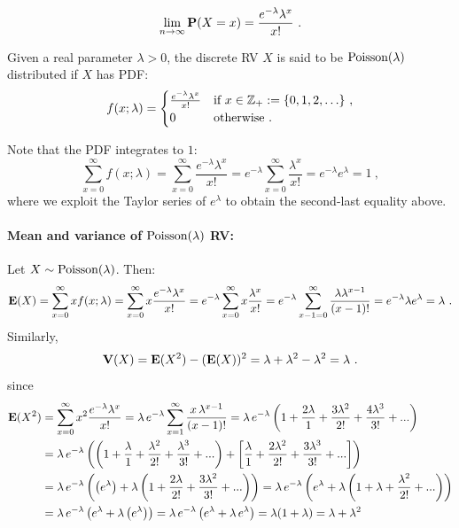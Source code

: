 \[
\lim_{n \to \infty} \mathbf{P}(X=x)
= \frac{ e^{-\lambda} \lambda^x}{x!}  \ .
\]
\begin{model}\label{M:Poisson}
Given a real parameter $\lambda>0$, the discrete RV $X$ is said to be $\mbox{{\rm Poisson}}(\lambda)$ distributed if $X$ has PDF:
\begin{equation}\label{E:Poissonpdf}
f(x;\lambda) =
\begin{cases}
 \frac{ e^{-\lambda} \lambda^x}{x!} & \text{if $x \in \mathbb{Z}_+ := \{0,1,2,\ldots\}$} \ , \\
0 & \text{otherwise} \ .
\end{cases}
\end{equation}

Note that the PDF integrates to $1$:
\[
\sum_{x=0}^{\infty} f(x;\lambda)
= \sum_{x=0}^{\infty}  \frac{ e^{-\lambda} \lambda^x}{x!}
=  e^{-\lambda} \sum_{x=0}^{\infty}  \frac{\lambda^x}{x!}
=  e^{-\lambda} e^{\lambda}
= 1 \ ,
\]
where we exploit the Taylor series of $e^{\lambda}$ to obtain the second-last equality above.
\end{model}

\paragraph{Mean and variance of $\mbox{{\rm Poisson}}(\lambda)$ RV:}
Let $X \sim \mbox{{\rm Poisson}}(\lambda)$.  Then:
\[
\mathbf{E}(X) = \sum_{x=0}^{\infty} x f(x;\lambda)
= \sum_{x =0}^{\infty} x \frac{ e^{-\lambda} \lambda^x}{x!}
= e^{-\lambda} \sum_{x =0}^{\infty} x \frac{  \lambda^x}{x!}
= e^{-\lambda} \sum_{x -1 =0}^{\infty} \frac{ \lambda \lambda^{x-1}}{(x-1)!}
= e^{-\lambda} \lambda e^{\lambda}
= \lambda
\ .
\]
Similarly,
\[
\V(X) = \e(X^2)-(\e(X))^2 = \lambda + \lambda^2 - \lambda^2 = \lambda \ .
\]
since
\begin{align*}
\mathbf{E}(X^2)& = \sum_{x=0}^{\infty} x^2 \frac{e^{-\lambda} \lambda^x}{x!} = \lambda \, e^{-\lambda} \sum_{x=1}^{\infty} \frac{x \, \lambda^{x-1}}{(x-1)!}
= \lambda \, e^{-\lambda} \left( 1 + \frac{2 \lambda}{1} + \frac{3 \lambda^2}{2!} + \frac{4 \lambda^3}{3!} + ... \right)\\
&= \lambda \, e^{-\lambda} \left( \left( 1 + \frac{\lambda}{1} + \frac{\lambda^2}{2!} + \frac{\lambda^3}{3!} + ... \right) + \left[ \frac{\lambda}{1} + \frac{2 \lambda^2}{2!} + \frac{3 \lambda^3}{3!} + ... \right] \right)\\
&= \lambda \, e^{-\lambda} \left( \left( e^{\lambda} \right) + \lambda \left( 1 + \frac{2 \lambda}{2!} + \frac{3 \lambda^2}{3!} + ... \right) \right)
= \lambda \, e^{-\lambda} \left( e^{\lambda} + \lambda \left( 1 + \lambda + \frac{\lambda^2}{2!} + ... \right) \right)\\
&= \lambda \, e^{-\lambda} \left( e^{\lambda} + \lambda \left( e^{\lambda} \right) \right)
= \lambda \, e^{-\lambda} \left( e^{\lambda} + \lambda\, e^{\lambda}\right) = \lambda (1 + \lambda) = \lambda + \lambda^2
\end{align*}

